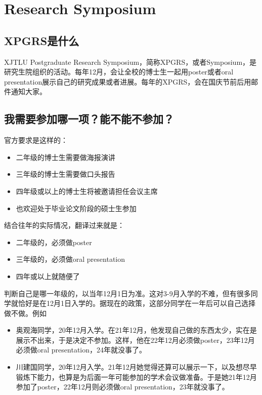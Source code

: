 \section{Research Symposium}

\subsection{XPGRS是什么}
XJTLU Postgraduate Research Symposium，简称XPGRS，或者Symposium，是研究生院组织的活动。每年12月，会让全校的博士生一起用poster或者oral presentation展示自己的研究成果或者进展。每年的XPGRS，会在国庆节前后用邮件通知大家。

\subsection{我需要参加哪一项？能不能不参加？}

官方要求是这样的：

\begin{itemize}
    \item 二年级的博士生需要做海报演讲
    \item 三年级的博士生需要做口头报告
    \item 四年级或以上的博士生将被邀请担任会议主席
    \item 也欢迎处于毕业论文阶段的硕士生参加
\end{itemize}

结合往年的实际情况，翻译过来就是：

\begin{itemize}
    \item 二年级的，必须做poster
    \item 三年级的，必须做oral presentation
    \item 四年或以上就随便了
\end{itemize}

判断自己是哪一年级的，以当年12月1日为准。这对3-9月入学的不难，但有很多同学就恰好是在12月1日入学的。据现在的政策，这部分同学在一年后可以自己选择做不做。例如

\begin{itemize}
    \item 奥观海同学，20年12月入学。在21年12月，他发现自己做的东西太少，实在是展示不出来，于是决定不参加。这样，他在22年12月必须做poster，23年12月必须做oral presentation，24年就没事了。
    \item 川建国同学，20年12月入学。21年12月她觉得还算可以展示一下，以及想尽早锻炼下能力，也算是为后面一年可能参加的学术会议做准备。于是她21年12月参加了poster，22年12月则必须做oral presentation，23年就没事了。
\end{itemize}

